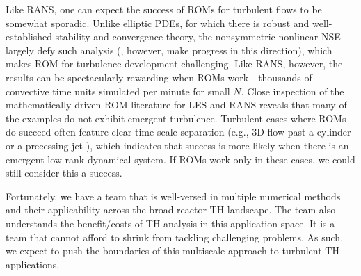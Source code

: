 


Like RANS, one can expect the success of ROMs for turbulent flows to
be somewhat sporadic.  
  Unlike elliptic PDEs, for which there is robust and well-established
stability and convergence theory, the nonsymmetric nonlinear NSE
largely defy such analysis (\cite{fick18,patera05}, however, make progress in this
direction), which makes ROM-for-turbulence development challenging.
Like RANS, however, the results can be spectacularly rewarding when ROMs
work---thousands of convective time units simulated per minute for small $N$.
   Close inspection of the mathematically-driven ROM literature for LES and
RANS reveals that many of the examples do not exhibit emergent turbulence.
Turbulent cases where ROMs do succeed often feature clear time-scale separation
(e.g., 3D flow past a cylinder \cite{wells2017evolve} or a precessing jet
\cite{akkari19}), which indicates that success is more likely when there 
is an emergent low-rank dynamical system.  If ROMs work only in these
cases, we could still consider this a success.

Fortunately, we have a team that is well-versed in multiple numerical methods
and their applicability across the broad reactor-TH landscape.  The team also
understands the benefit/costs of TH analysis in this application space.  It is
a team that cannot afford to shrink from tackling challenging problems.  As
such, we expect to push the boundaries of this multiscale approach to turbulent 
TH applications.
